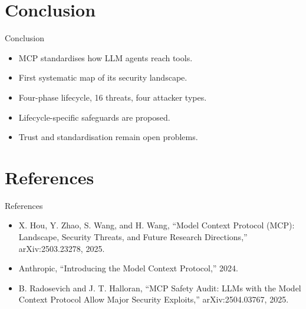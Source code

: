 \documentclass{beamer}
\begin{document}
\section{Conclusion}
\begin{frame}{Conclusion}
\begin{itemize}
  \item MCP standardises how LLM agents reach tools.
  \item First systematic map of its security landscape.
  \item Four-phase lifecycle, 16 threats, four attacker types.
  \item Lifecycle-specific safeguards are proposed.
  \item Trust and standardisation remain open problems.
\end{itemize}
\end{frame}

\section{References}
\begin{frame}{References}
\footnotesize
\begin{itemize}
  \item X. Hou, Y. Zhao, S. Wang, and H. Wang, ``Model Context Protocol (MCP): Landscape, Security Threats, and Future Research Directions,'' arXiv:2503.23278, 2025.
  \item Anthropic, ``Introducing the Model Context Protocol,'' 2024.
  \item B. Radosevich and J. T. Halloran, ``MCP Safety Audit: LLMs with the Model Context Protocol Allow Major Security Exploits,'' arXiv:2504.03767, 2025.
\end{itemize}
\end{frame}
\begin{frame}\vfill{}\vfill\end{frame}
\end{document}
